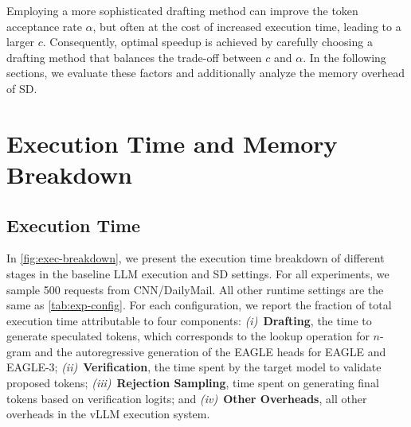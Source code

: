 Employing a more sophisticated drafting method can improve the token acceptance rate $\alpha$, but often at the cost of increased execution time, leading to a larger $c$. Consequently, optimal speedup is achieved by carefully choosing a drafting method that balances the trade-off between $c$ and $\alpha$. In the following sections, we evaluate these factors and additionally analyze the memory overhead of SD.

\section{Execution Time and Memory Breakdown}
\label{sec:breakdown}

\subsection{Execution Time}
In \autoref{fig:exec-breakdown}, we present the execution time breakdown of different stages in the baseline LLM execution and SD settings. For all experiments, we sample 500 requests from CNN/DailyMail. All other runtime settings are the same as \autoref{tab:exp-config}. 
For each configuration, we report the fraction of total execution time attributable to four components:
\textit{(i)}~\textbf{Drafting}, the time to generate speculated tokens, which corresponds to the lookup operation for $n$-gram and the autoregressive generation of the EAGLE heads for EAGLE and EAGLE-3;
\textit{(ii)}~\textbf{Verification}, the time spent by the target model to validate proposed tokens;
\textit{(iii)}~\textbf{Rejection Sampling}, time spent on generating final tokens based on verification logits;
and \textit{(iv)}~\textbf{Other Overheads}, all other overheads in the vLLM execution system. 

